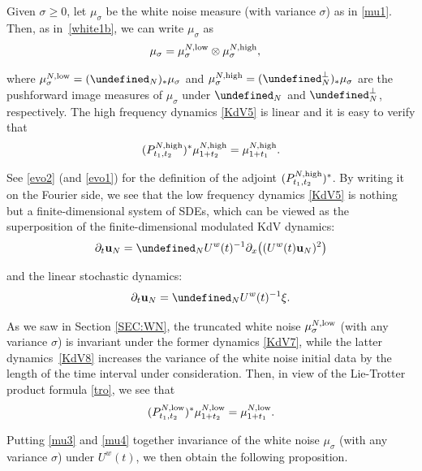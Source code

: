 \documentclass[letterpaper, 11pt,  reqno]{amsart}
\newcommand{\1}{\hspace{0.5mm}\text{I}\hspace{0.5mm}}
\newcommand{\noi}{\noindent}
\let\P= \undefined
\newcommand{\P}{\mathbf{P}}
\newcommand{\low}{\textup{low}}
\newcommand{\high}{\textup{high}}
\newcommand{\s}{\sigma}
\newcommand{\dx}{\partial_x}
\newcommand{\dt}{\partial_t}
\newcommand{\uw}{U^w}
\newcommand{\uu}{\mathbf{u}}
\numberwithin{equation}{section}
\numberwithin{theorem}{section}
\begin{document}
Given $\s \ge 0$, let $\mu_\s$ be the white noise measure (with variance $\s$)
as in \eqref{mu1}.
Then, as in~\eqref{white1b}, we can write $\mu_\s$ as
\begin{align*}
 \mu_\s 
 & =  \mu_\s^{N, \low} \otimes \mu_\s^{N, \high}, 
\end{align*}

\noi
where $\mu_\s^{N, \low} = (\P_N)_* \mu_\s$ and 
$\mu_\s^{N, \high} = (\P_N^\perp)_* \mu_\s$
are 
the pushforward image measures of $\mu_\s$ under
$\P_N$ and $\P_N^\perp$, respectively.
The high frequency dynamics \eqref{KdV5}
is linear and it is easy to verify 
that 
\begin{align}
(P^{N, \high}_{t_1, t_2})^* \mu^{N, \high}_{1+t_2}
=   \mu^{N, \high}_{1+t_1 }.
\label{mu3}
\end{align}

\noi
See \eqref{evo2} (and \eqref{evo1})
for the definition of the adjoint $(P^{N, \high}_{t_1, t_2})^*$.
By writing it on the Fourier side, 
we see that the low frequency dynamics \eqref{KdV5}
is nothing but a finite-dimensional system of SDEs,
which can be viewed as the superposition of 
the finite-dimensional modulated KdV dynamics:
\begin{align}
\dt \uu_N = \P_N\uw(t)^{-1} \dx\big( ( \uw(t) \uu_N)^2\big)
\label{KdV7}
\end{align}

\noi
and the linear stochastic dynamics:
\begin{align}
\dt \uu_N = 
 \P_N  \uw(t)^{-1} \xi.
\label{KdV8}
\end{align}

\noi
As we saw in Section \ref{SEC:WN}, 
the truncated white noise $\mu_\s^{N, \low}$ (with any variance $\s$)
is invariant under  the former dynamics \eqref{KdV7}, 
while 
the latter dynamics~\eqref{KdV8}
increases the variance of the white noise initial data by the length of the time interval under consideration.
Then, in view of the Lie-Trotter product formula \eqref{tro}, 
we see that 
\begin{align}
(P^{N, \low}_{t_1, t_2})^* \mu^{N, \low}_{1+t_2}
=   \mu^{N, \low}_{1+t_1 }.
\label{mu4}
\end{align}



\noi
Putting \eqref{mu3} and \eqref{mu4} together
invariance of the white noise $\mu_\s$ (with any variance $\s$)
under $\uw(t)$, 
we then obtain the following proposition.
\end{document}
